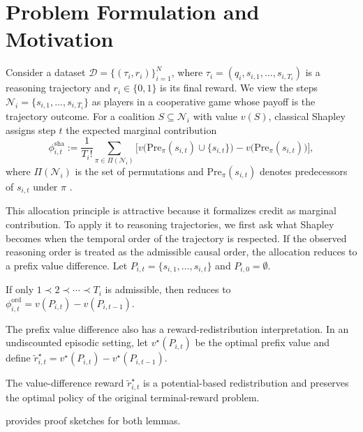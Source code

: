 \section{Problem Formulation and Motivation}
\label{sec:formulation}

Consider a dataset
\(
\mathcal{D}=\{(\tau_i,r_i)\}_{i=1}^{N}
\),
where
\(
\tau_i=(q_i,s_{i,1},\ldots,s_{i,T_i})
\)
is a reasoning trajectory and \(r_i\in\{0,1\}\) is its final reward.
We view the steps
\(
\mathcal{N}_i=\{s_{i,1},\ldots,s_{i,T_i}\}
\)
as players in a cooperative game whose payoff is the trajectory outcome.
For a coalition \(S\subseteq\mathcal{N}_i\) with value \(v(S)\), classical
Shapley assigns step \(t\) the expected marginal contribution
\begin{equation}
\label{eq:discrete_shapley}
\phi_{i,t}^{\mathrm{sha}}
:=
\frac{1}{T_i!}
\sum_{\pi\in\Pi(\mathcal{N}_i)}
\Big[
v\!\big(\mathrm{Pre}_{\pi}(s_{i,t})\cup\{s_{i,t}\}\big)
-
v\!\big(\mathrm{Pre}_{\pi}(s_{i,t})\big)
\Big],
\end{equation}
where \(\Pi(\mathcal{N}_i)\) is the set of permutations and
\(\mathrm{Pre}_{\pi}(s_{i,t})\) denotes predecessors of \(s_{i,t}\) under
\(\pi\) \citep{shapley1953value}.

This allocation principle is attractive because it formalizes credit as
marginal contribution.
To apply it to reasoning trajectories, we first ask what Shapley becomes when
the temporal order of the trajectory is respected.
If the observed reasoning order is treated as the admissible causal order, the
allocation reduces to a prefix value difference.
Let
\(
P_{i,t}=\{s_{i,1},\ldots,s_{i,t}\}
\)
and \(P_{i,0}=\emptyset\).
\begin{lemma}
\label{lem:ordered_shapley_degenerate}
If only \(1\prec 2\prec \cdots \prec T_i\) is admissible, then
 reduces to
\(
\phi_{i,t}^{\mathrm{ord}}=v(P_{i,t})-v(P_{i,t-1})
\).
\end{lemma}

The prefix value difference also has a reward-redistribution interpretation.
In an undiscounted episodic setting, let \(v^\star(P_{i,t})\) be the optimal
prefix value and define
\(
\tilde r_{i,t}^\star=v^\star(P_{i,t})-v^\star(P_{i,t-1})
\).
\begin{lemma}
\label{lem:reward_shaping_invariance}
The value-difference reward \(\tilde r_{i,t}^\star\) is a potential-based
redistribution and preserves the optimal policy of the original terminal-reward
problem.
\end{lemma}
 provides proof sketches for both
lemmas.


